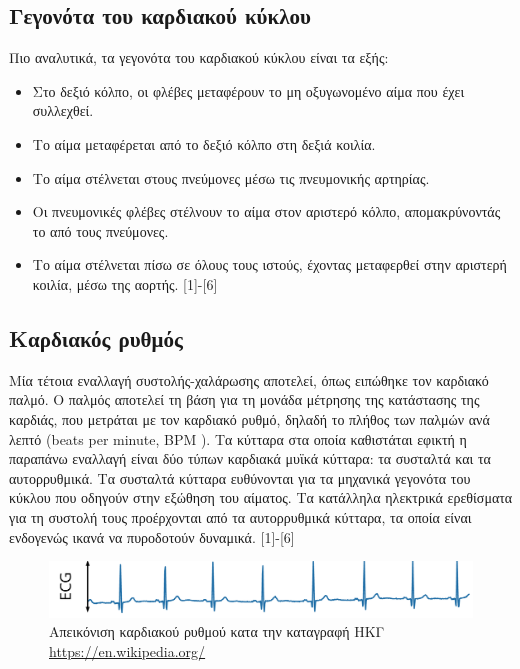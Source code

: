 \documentclass{report}
\newcommand \en {\selectlanguage{english}}
\newcommand \gr {\selectlanguage{greek}}
\begin{document}
	\subsection{Γεγονότα  του καρδιακού κύκλου}
	Πιο αναλυτικά, τα γεγονότα του καρδιακού κύκλου είναι τα εξής:
	\begin{itemize}
		\item Στο δεξιό κόλπο, οι φλέβες μεταφέρουν το μη οξυγωνομένο αίμα που έχει συλλεχθεί. 
		\item Το αίμα μεταφέρεται από το δεξιό κόλπο στη δεξιά κοιλία.
		\item Το αίμα στέλνεται στους πνεύμονες μέσω τις πνευμονικής αρτηρίας.
		\item Οι πνευμονικές φλέβες στέλνουν το αίμα στον αριστερό κόλπο, απομακρύνοντάς το από τους πνεύμονες.
		\item Το αίμα στέλνεται πίσω σε όλους τους ιστούς, έχοντας μεταφερθεί στην αριστερή κοιλία, μέσω της αορτής. [1]-[6]
	\end{itemize}
	\subsection{Καρδιακός ρυθμός}
	Μία τέτοια εναλλαγή συστολής-χαλάρωσης αποτελεί, όπως ειπώθηκε τον καρδιακό παλμό. Ο παλμός αποτελεί τη βάση για τη μονάδα μέτρησης της κατάστασης της καρδιάς, που μετράται με τον καρδιακό ρυθμό, δηλαδή το πλήθος των παλμών ανά λεπτό (\en beats per minute, BPM \gr). Τα κύτταρα στα οποία καθιστάται εφικτή η παραπάνω εναλλαγή είναι δύο τύπων καρδιακά μυϊκά κύτταρα: τα συσταλτά και τα αυτορρυθμικά. Τα συσταλτά κύτταρα ευθύνονται για τα μηχανικά γεγονότα του κύκλου που οδηγούν στην εξώθηση του αίματος. Τα κατάλληλα ηλεκτρικά ερεθίσματα για τη συστολή τους προέρχονται από τα αυτορρυθμικά κύτταρα, τα οποία είναι ενδογενώς ικανά να πυροδοτούν δυναμικά. [1]-[6]
	
	\begin{figure}
		\centering
		\includegraphics[scale=0.3]{heart rhythm.png}    \caption{Απεικόνιση καρδιακού ρυθμού κατα την καταγραφή ΗΚΓ \en \protect\url{https://en.wikipedia.org/}}
	\end{figure}
	
\end{document}
